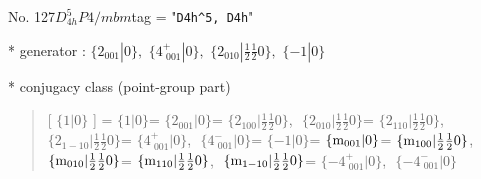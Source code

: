 \documentclass[fleqn,10pt,landscape]{jsarticle}
\begin{document}
\newpage

No. 127\quad$D_{4h}^{5}$\quad$P4/mbm$\quad[ tetragonal ]
tag = "{\tt D4h^5, D4h}"

* generator : $\{2{}_{001}|0\},\,\,\{4^{+}_{\,\,001}|0\},\,\,\{2{}_{010}|\frac{1}{2} \frac{1}{2} 0\},\,\,\{-1|0\}$

* conjugacy class (point-group part)
\begin{quote}
[ $\{1|0\}$ ] = \quad $\{1|0\}$\newline[ $\{2{}_{001}|0\}$ ] = \quad $\{2{}_{001}|0\}$ = \quad $\{2{}_{100}|\frac{1}{2} \frac{1}{2} 0\}$,\,\, $\{2{}_{010}|\frac{1}{2} \frac{1}{2} 0\}$ = \quad $\{2{}_{110}|\frac{1}{2} \frac{1}{2} 0\}$,\,\, $\{2{}_{1-10}|\frac{1}{2} \frac{1}{2} 0\}$\newline[ $\{4^{+}_{\,\,001}|0\}$ ] = \quad $\{4^{+}_{\,\,001}|0\}$,\,\, $\{4^{-}_{\,\,001}|0\}$\newline[ $\{-1|0\}$ ] = \quad $\{-1|0\}$\newline[ $\{{\rm m}_{001}|0\}$ ] = \quad $\{{\rm m}_{001}|0\}$ = \quad $\{{\rm m}_{100}|\frac{1}{2} \frac{1}{2} 0\}$,\,\, $\{{\rm m}_{010}|\frac{1}{2} \frac{1}{2} 0\}$ = \quad $\{{\rm m}_{110}|\frac{1}{2} \frac{1}{2} 0\}$,\,\, $\{{\rm m}_{1-10}|\frac{1}{2} \frac{1}{2} 0\}$\newline[ $\{-4^{+}_{\,\,001}|0\}$ ] = \quad $\{-4^{+}_{\,\,001}|0\}$,\,\, $\{-4^{-}_{\,\,001}|0\}$\newline
\end{quote}
\end{document}
